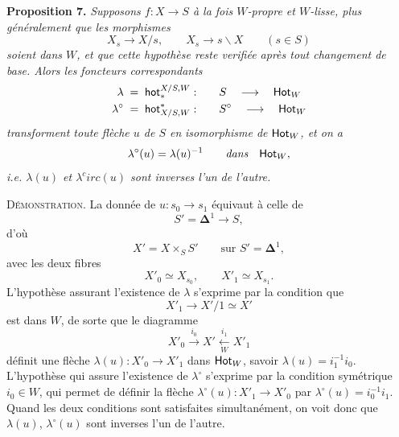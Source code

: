 \textbf{Proposition 7.} \textit{Supposons $f : X\longrightarrow S$ à la fois $W$-propre et $W$-lisse, plus généralement que les morphismes}
\[
X_s\longrightarrow X/s,\qquad X_s\longrightarrow s\backslash X\qquad(s\in S)
\]
\textit{soient dans $W$, et que cette hypothèse reste verifiée après tout changement de base. Alors les foncteurs correspondants} %
\[
\begin{aligned}
\lambda &\;=\;\mathsf{hot}_*^{X/S,W} : &&\quad S \quad\longrightarrow\quad \mathsf{Hot}_W\\
\lambda^\circ &\;=\;\mathsf{hot}^*_{X/S,W} : &&\quad S^\circ \quad\longrightarrow\quad \mathsf{Hot}_W
\end{aligned}
\]
\textit{transforment toute flèche $u$ de $S$ en} \textit{isomorphisme de} $\mathsf{Hot}_W$\textit{, et on a}
\[
\lambda^\circ(u)=\lambda(u)^{-1}\qquad\textit{dans}\quad\mathsf{Hot}_W,
\]
\textit{i.e. $\lambda(u)$ et $\lambda^c irc(u)$ sont inverses l'un de l'autre.} %

\textsc{Démonstration}. La donnée de $u : s_0\longrightarrow s_1$ équivaut à celle de
\[
S'=\mathbf{\Delta}^1\longrightarrow S,
\]
d'où
\[
X'=X\times_S S'\qquad\text{sur } S'=\mathbf{\Delta}^1,
\]
avec les deux fibres
\[
X'_0\simeq X_{s_0},\qquad X'_1\simeq X_{s_1}.
\]
L'hypothèse assurant l'existence de $\lambda$ s'exprime par la condition que
\[
X'_1\longrightarrow X'/1\simeq X'
\]
est dans $W$, de sorte que le diagramme
\[
X'_0\xrightarrow{i_0}X'\xleftarrow[W]{i_1}X'_1
\]
définit une flèche $\lambda(u) : X'_0\longrightarrow X'_1$ dans $\mathsf{Hot}_W$, savoir $\lambda(u)=i_1^{-1}i_0$. L'hypothèse qui assure l'existence de $\lambda^\circ$ s'exprime par la condition symétrique $i_0\in W$, qui permet de définir la flèche $\lambda^\circ(u) : X'_1\longrightarrow X'_0$ par $\lambda^\circ(u)=i_0^{-1}i_1$. Quand les deux conditions sont satisfaites simultanément, on voit donc que $\lambda(u)$, $\lambda^\circ(u)$ sont inverses l'un de l'autre.

